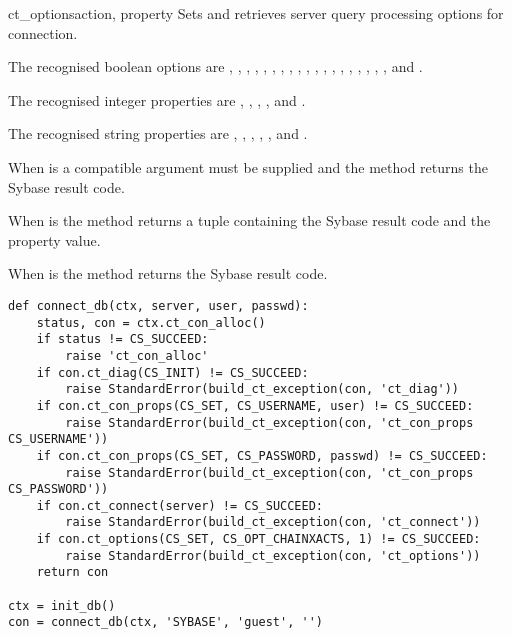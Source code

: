 \begin{methoddesc}[CS_CONNECTION]{ct_options}{action, property }
Sets and retrieves server query processing options for connection.

The recognised boolean options are ,
, ,
, ,
, ,
, ,
, ,
, ,
, ,
, ,
, , and
.

The recognised integer properties are ,
, ,
, and .

The recognised string properties are ,
, ,
, , and
.

When  is  a compatible  argument
must be supplied and the method returns the Sybase result code.

When  is  the method returns a tuple
containing the Sybase result code and the property value.

When  is  the method returns the Sybase
result code.

\begin{verbatim}
def connect_db(ctx, server, user, passwd):
    status, con = ctx.ct_con_alloc()
    if status != CS_SUCCEED:
    	raise 'ct_con_alloc'
    if con.ct_diag(CS_INIT) != CS_SUCCEED:
    	raise StandardError(build_ct_exception(con, 'ct_diag'))
    if con.ct_con_props(CS_SET, CS_USERNAME, user) != CS_SUCCEED:
    	raise StandardError(build_ct_exception(con, 'ct_con_props CS_USERNAME'))
    if con.ct_con_props(CS_SET, CS_PASSWORD, passwd) != CS_SUCCEED:
    	raise StandardError(build_ct_exception(con, 'ct_con_props CS_PASSWORD'))
    if con.ct_connect(server) != CS_SUCCEED:
    	raise StandardError(build_ct_exception(con, 'ct_connect'))
    if con.ct_options(CS_SET, CS_OPT_CHAINXACTS, 1) != CS_SUCCEED:
        raise StandardError(build_ct_exception(con, 'ct_options'))
    return con

ctx = init_db()
con = connect_db(ctx, 'SYBASE', 'guest', '')
\end{verbatim}
\end{methoddesc}

